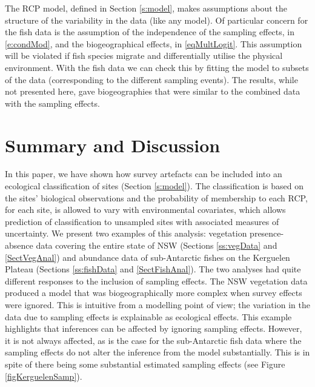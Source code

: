 \documentclass{statsoc}
\begin{document}
The RCP model, defined in Section \ref{s:model}, makes assumptions about the structure of the variability in the data (like any model). Of particular concern for the fish data is the assumption of the independence of the sampling effects, in \eqref{e:condMod}, and the biogeographical effects, in \eqref{eqMultLogit}. This assumption will be violated if fish species migrate and differentially utilise the physical environment. With the fish data we can check this by fitting the model to subsets of the data (corresponding to the different sampling events). The results, while not presented here, gave biogeographies that were similar to the combined data with the sampling effects. %


\section{Summary and Discussion}\label{SectSummDis}

In this paper, we have shown how survey artefacts can be included into an ecological classification of sites (Section \ref{s:model}). The classification is based on the sites' biological observations and the probability of membership to each RCP, for each site, is allowed to vary with environmental covariates, which allows prediction of classification to unsampled sites with associated measures of uncertainty. We present two examples of this analysis: vegetation presence-absence data covering the entire state of NSW (Sections \ref{ss:vegData} and \ref{SectVegAnal}) and abundance data of sub-Antarctic fishes on the Kerguelen Plateau (Sections \ref{ss:fishData} and \ref{SectFishAnal}). The two analyses had quite different responses to the inclusion of sampling effects. The NSW vegetation data produced a model that was biogeographically more complex when survey effects were ignored. This is intuitive from a modelling point of view; the variation in the data due to sampling effects is explainable as ecological effects. This example highlights that inferences can be affected by ignoring sampling effects. However, it is not always affected, as is the case for the sub-Antarctic fish data where the sampling effects do not alter the inference from the model substantially. This is in spite of there being some substantial estimated sampling effects (see Figure \ref{figKerguelenSamp}).
\end{document}
